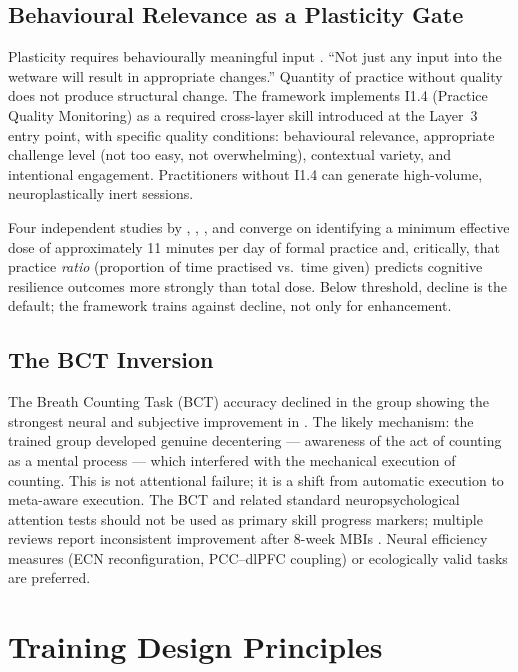 \documentclass[12pt, a4paper]{article}
\begin{document}
\subsection{Behavioural Relevance as a Plasticity Gate}

Plasticity requires behaviourally meaningful input \citep{fallon2009, beyeler2017}.
``Not just any input into the wetware will result in appropriate changes.''
Quantity of practice without quality does not produce structural change. The framework
implements I1.4 (Practice Quality Monitoring) as a required cross-layer skill
introduced at the Layer~3 entry point, with specific quality conditions: behavioural
relevance, appropriate challenge level (not too easy, not overwhelming), contextual
variety, and intentional engagement. Practitioners without I1.4 can generate
high-volume, neuroplastically inert sessions.

Four independent studies by \citet{jha2015}, \citet{jha2016}, \citet{jha2017}, and
\citet{jha2020} converge on identifying a minimum effective dose of approximately
11 minutes per day of formal practice and, critically, that practice \emph{ratio}
(proportion of time practised vs.\ time given) predicts cognitive resilience
outcomes more strongly than total dose. Below threshold, decline is the default;
the framework trains against decline, not only for enhancement.

\subsection{The BCT Inversion}

The Breath Counting Task (BCT) accuracy declined in the group showing the strongest
neural and subjective improvement in \citet{ganesan2025}. The likely mechanism:
the trained group developed genuine decentering --- awareness of the act of counting
as a mental process --- which interfered with the mechanical execution of counting.
This is not attentional failure; it is a shift from automatic execution to
meta-aware execution. The BCT and related standard neuropsychological attention tests
should not be used as primary skill progress markers; multiple reviews report
inconsistent improvement after 8-week MBIs \citep{calderone2024, gkintoni2025}.
Neural efficiency measures (ECN reconfiguration, PCC--dlPFC coupling) or
ecologically valid tasks are preferred.

\section{Training Design Principles}
\end{document}
